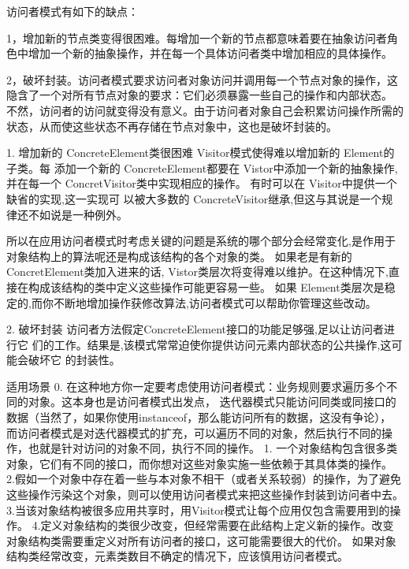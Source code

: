 \documentclass{book}
\begin{document}
\begin{CJK}{UTF8}{gbsn}
访问者模式有如下的缺点：

1，增加新的节点类变得很困难。每增加一个新的节点都意味着要在抽象访问者角色中增加一个新的抽象操作，并在每一个具体访问者类中增加相应的具体操作。

2，破坏封装。访问者模式要求访问者对象访问并调用每一个节点对象的操作，这隐含了一个对所有节点对象的要求：它们必须暴露一些自己的操作和内部状态。
    不然，访问者的访问就变得没有意义。由于访问者对象自己会积累访问操作所需的状态，从而使这些状态不再存储在节点对象中，这也是破坏封装的。

1. 增加新的 ConcreteElement类很困难 
Visitor模式使得难以增加新的 Element的子类。每 添加一个新的 ConcreteElement都要在 Vistor中添加一个新的抽象操作,并在每一个 ConcretVisitor类中实现相应的操作。
    有时可以在 Visitor中提供一个缺省的实现,这一实现可 以被大多数的 ConcreteVisitor继承,但这与其说是一个规律还不如说是一种例外。 

所以在应用访问者模式时考虑关键的问题是系统的哪个部分会经常变化,是作用于对象结构上的算法呢还是构成该结构的各个对象的类。
    如果老是有新的 ConcretElement类加入进来的话, Vistor类层次将变得难以维护。在这种情况下,直接在构成该结构的类中定义这些操作可能更容易一些。
    如果 Element类层次是稳定的,而你不断地增加操作获修改算法,访问者模式可以帮助你管理这些改动。 

2. 破坏封装 
访问者方法假定ConcreteElement接口的功能足够强,足以让访问者进行它 们的工作。结果是,该模式常常迫使你提供访问元素内部状态的公共操作,这可能会破坏它 的封装性。 

\end{CJK}

\begin{CJK}{UTF8}{gbsn}
适用场景
0. 在这种地方你一定要考虑使用访问者模式：业务规则要求遍历多个不同的对象。这本身也是访问者模式出发点，
    迭代器模式只能访问同类或同接口的数据（当然了，如果你使用instanceof，那么能访问所有的数据，这没有争论），
    而访问者模式是对迭代器模式的扩充，可以遍历不同的对象，然后执行不同的操作，也就是针对访问的对象不同，执行不同的操作。
1. 一个对象结构包含很多类对象，它们有不同的接口，而你想对这些对象实施一些依赖于其具体类的操作。
2.假如一个对象中存在着一些与本对象不相干（或者关系较弱）的操作，为了避免这些操作污染这个对象，则可以使用访问者模式来把这些操作封装到访问者中去。
3.当该对象结构被很多应用共享时，用Visitor模式让每个应用仅包含需要用到的操作。
4.定义对象结构的类很少改变，但经常需要在此结构上定义新的操作。改变对象结构类需要重定义对所有访问者的接口，这可能需要很大的代价。
    如果对象结构类经常改变，元素类数目不确定的情况下，应该慎用访问者模式。
\end{CJK}
\begin{figure}[H]
\begin{floatrow}
\end{floatrow}
\end{figure}
\end{document}
